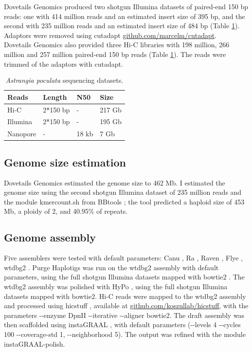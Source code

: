 Dovetails Genomics produced two shotgun Illumina datasets of paired-end 150 bp reads: one with 414 million reads and an estimated insert size of 395 bp, and the second with 235 million reads and an estimated insert size of 484 bp (Table \ref{tab:apoculata_datasets}). Adaptors were removed using  cutadapt \href{https://github.com/marcelm/cutadapt}{github.com/marcelm/cutadapt}. \\

Dovetails Genomics also provided three Hi-C libraries with 198 million, 266 million and 257 million paired-end 150 bp reads (Table \ref{tab:apoculata_datasets}). The reads were trimmed of the adaptors with cutadapt.\\

\begin{table}[H]
\centering
\caption{\textit{Astrangia poculata} sequencing datasets.}
\begin{tabular}{|l|l|l|l|}
\hline
\textbf{Reads} & \textbf{Length} & \textbf{N50} & \textbf{Size} \\
\hline
Hi-C & 2*150 bp & - & 217 Gb \\
Illumina & 2*150 bp & - & 195 Gb\\
Nanopore & - & 18 kb & 7 Gb \\
\hline
\end{tabular}
\label{tab:apoculata_datasets}
\end{table}

\subsection{Genome size estimation}

Dovetails Genomics estimated the genome size to 462 Mb. I estimated the genome size using the second shotgun Illumina dataset of 235 million reads and the module kmercount.sh from BBtools \cite{bbtools}; the tool predicted a haploid size of 453 Mb, a ploidy of 2, and 40.95\% of repeats. 

\subsection{Genome assembly}

Five assemblers were tested with default parameters: Canu \cite{canu}, Ra \cite{ra}, Raven \cite{raven}, Flye \cite{flye}, wtdbg2 \cite{wtdbg2}. Purge Haplotigs \cite{purge_haplotigs} was run on the wtdbg2 assembly with default parameters, using the full shotgun Illumina datasets mapped with bowtie2 \cite{bowtie2}. The wtdbg2 assembly was polished with HyPo \cite{hypo}, using the full shotgun Illumina datasets mapped with bowtie2. Hi-C reads were mapped to the wtdbg2 assembly and processed using hicstuff \cite{hicstuff}, available at \href{https://github.com/koszullab/hicstuff}{github.com/koszullab/hicstuff}, with the parameters -{}-enzyme DpnII -{}-iterative -{}-aligner bowtie2. The draft assembly was then scaffolded using instaGRAAL \cite{instagraal}, with default parameters (-{}-levels 4 -{}-cycles 100 -{}-coverage-std 1, -{}-neighborhood 5). The output was refined with the module instaGRAAL-polish. \\

